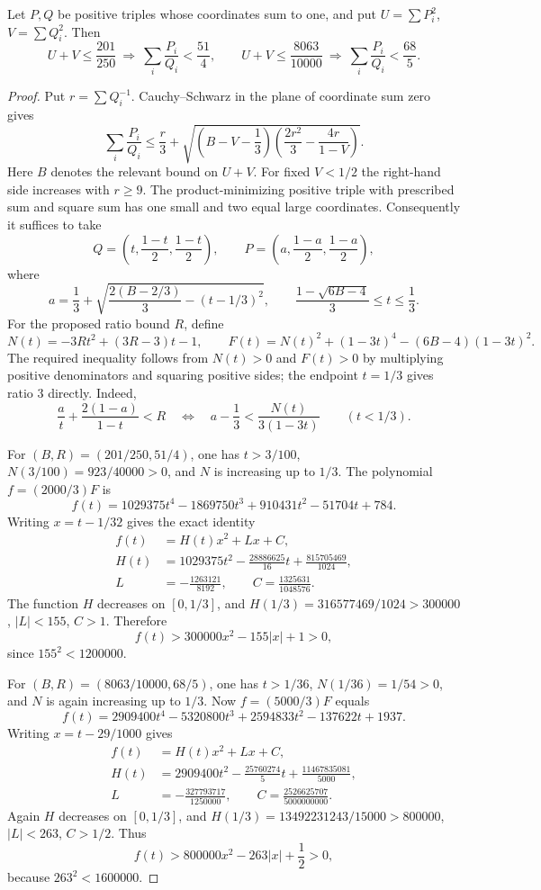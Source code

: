 \begin{lemma}\label{lem:triple-ratios-950}
Let $P,Q$ be positive triples whose coordinates sum to one, and put
$U=\sum P_i^2$, $V=\sum Q_i^2$. Then
\[
 U+V\le\frac{201}{250}\ \Longrightarrow\ 
 \sum_i\frac{P_i}{Q_i}<\frac{51}{4},\qquad
 U+V\le\frac{8063}{10000}\ \Longrightarrow\ 
 \sum_i\frac{P_i}{Q_i}<\frac{68}{5}.
\]
\end{lemma}
\begin{proof}
Put $r=\sum Q_i^{-1}$. Cauchy--Schwarz in the plane of coordinate sum
zero gives
\[
 \sum_i\frac{P_i}{Q_i}\le
 \frac r3+\sqrt{\left(B-V-\frac13\right)
             \left(\frac{2r^2}{3}-\frac{4r}{1-V}\right)}.
\]
Here $B$ denotes the relevant bound on $U+V$. For fixed $V<1/2$ the
right-hand side increases with $r\ge9$. The product-minimizing positive
triple with prescribed sum and square sum has one small and two equal
large coordinates. Consequently it suffices to take
\[
 Q=\left(t,\frac{1-t}{2},\frac{1-t}{2}\right),\qquad
 P=\left(a,\frac{1-a}{2},\frac{1-a}{2}\right),
\]
where
\[
 a=\frac13+\sqrt{\frac{2(B-2/3)}3-(t-1/3)^2},\qquad
 \frac{1-\sqrt{6B-4}}3\le t\le\frac13.
\]
For the proposed ratio bound $R$, define
\[
 N(t)=-3Rt^2+(3R-3)t-1,\qquad
 F(t)=N(t)^2+(1-3t)^4-(6B-4)(1-3t)^2.
\]
The required inequality follows from $N(t)>0$ and $F(t)>0$ by
multiplying positive denominators and squaring positive sides; the
endpoint $t=1/3$ gives ratio $3$ directly. Indeed,
\[
 \frac at+\frac{2(1-a)}{1-t}<R
 \quad\Longleftrightarrow\quad
 a-\frac13<\frac{N(t)}{3(1-3t)}
 \qquad(t<1/3).
\]

For $(B,R)=(201/250,51/4)$, one has $t>3/100$,
$N(3/100)=923/40000>0$, and $N$ is increasing up to $1/3$.
The polynomial $f=(2000/3)F$ is
\[
 f(t)=1029375t^4-1869750t^3+910431t^2-51704t+784.
\]
Writing $x=t-1/32$ gives the exact identity
\[
\begin{split}
 f(t)&=H(t)x^2+Lx+C,\\
 H(t)&=1029375t^2-\frac{28886625}{16}t
                         +\frac{815705469}{1024},\\
 L&=-\frac{1263121}{8192},\qquad C=\frac{1325631}{1048576}.
\end{split}
\]
The function $H$ decreases on $[0,1/3]$, and
$H(1/3)=316577469/1024>300000$, $|L|<155$, $C>1$.
Therefore
\[
 f(t)>300000x^2-155|x|+1>0,
\]
since $155^2<1200000$.

For $(B,R)=(8063/10000,68/5)$, one has $t>1/36$,
$N(1/36)=1/54>0$, and $N$ is again increasing up to $1/3$.
Now $f=(5000/3)F$ equals
\[
 f(t)=2909400t^4-5320800t^3+2594833t^2-137622t+1937.
\]
Writing $x=t-29/1000$ gives
\[
\begin{split}
 f(t)&=H(t)x^2+Lx+C,\\
 H(t)&=2909400t^2-\frac{25760274}{5}t
                            +\frac{11467835081}{5000},\\
 L&=-\frac{327793717}{1250000},\qquad
 C=\frac{2526625707}{5000000000}.
\end{split}
\]
Again $H$ decreases on $[0,1/3]$, and
$H(1/3)=13492231243/15000>800000$, $|L|<263$, $C>1/2$.
Thus
\[
 f(t)>800000x^2-263|x|+\frac12>0,
\]
because $263^2<1600000$.
\end{proof}

